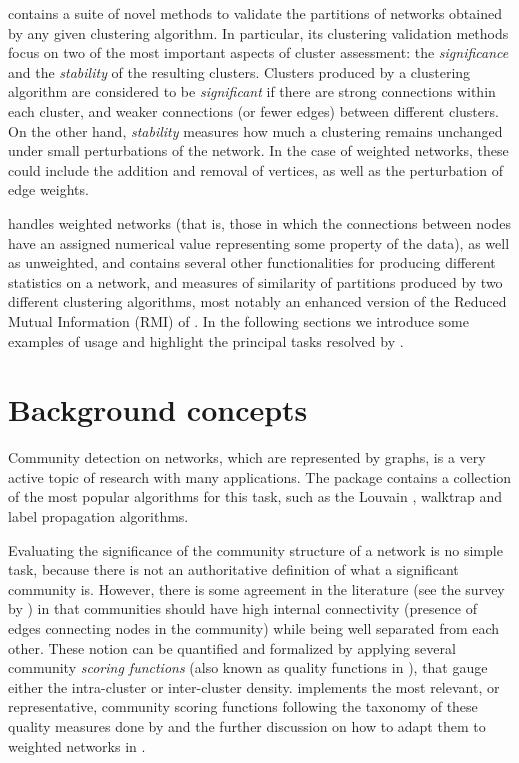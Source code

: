   contains a suite of 
novel methods to validate the  partitions  of  networks obtained by any given clustering algorithm. 
In particular, its clustering validation methods focus on two of the most important aspects of cluster assessment: the {\em significance} and the {\em stability} of the resulting clusters.
Clusters produced by a clustering algorithm are considered to be {\em significant} if there are  strong connections within each cluster, and weaker connections (or fewer edges) between different clusters. 
On the other hand, {\em stability} measures how much a clustering remains unchanged under small perturbations of the network. In the case of weighted networks, these could include the addition and removal of vertices, as well as the perturbation of edge weights. 

 handles weighted networks (that is, those in which the connections between nodes have an assigned numerical value representing some property of the data), as well as unweighted, and contains several other functionalities for producing different statistics on a network, and measures of similarity of partitions produced by two different clustering algorithms, most notably an enhanced version of the Reduced Mutual Information (RMI) of \cite{corrected_MI_Newman2020}.
In the following sections we introduce some examples of usage and highlight the principal tasks resolved by .

\section{Background concepts}

Community detection on networks, which are represented by graphs, is a very active topic of research with many applications. The  \citep{igraph} package contains a collection of the most popular algorithms for this task, such as the Louvain \citep{fastunfolding}, walktrap \citep{walktrap} and label propagation \cite{label_propagation} algorithms.


Evaluating the significance of the community structure of a network is no simple task, because there is not an authoritative definition of what a significant community is. However, there is some agreement in the literature (see the survey by \cite{Fortunato2010}) in that communities should have high internal connectivity (presence of edges connecting nodes in the community) while being well separated from each other. These notion can be quantified and formalized by applying several community {\em scoring functions} (also known as quality functions  in \citep{Fortunato2010}), that gauge either the intra-cluster or inter-cluster density.  implements the most relevant, or representative, community scoring functions following the 
taxonomy of these quality measures done by \cite{groundtruth} and the further discussion on how to adapt them to weighted networks in \citep{arratia2021clustering}.

